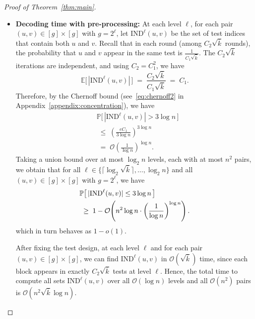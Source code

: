 \documentclass[journal]{IEEEtran}
\newcommand{\rEm}{\mathrm{E}_{\max}}
\theoremstyle{definition}
\theoremstyle{definition}
\newcommand{\EE}{\mathbb{E}}
\newcommand{\PP}{\mathbb{P}}
\newcommand{\kb}{\overline{k}}
\newcommand{\ID}{\mathrm{IND}}
\newcommand{\bigO}{\mathcal{O}}
\begin{document}
\begin{proof}[Proof of Theorem~\ref{thm:main}]
\begin{itemize}
		A similar argument applies to the case \( \theta \leq \frac{1}{2} \), with at most \( \rEm =  2\kb \log^2 \kb \) (see~\eqref{eq:number_edges_level}) defective pairs at each level.

    \item \textbf{Decoding time with pre-processing:} At each level $\ell$, for each pair $(u,v) \in [g]\times[g]$ with $g=2^\ell$, let $\ID^{\ell}(u,v)$ be the set of test indices that contain both $u$ and $v$. Recall that in each round (among $C_2\sqrt{\kb}$ rounds), the probability that $u$ and $v$ appear in the same test is $\frac{1}{C_1\sqrt{\kb}}$. The $C_2\sqrt{\kb}$ iterations are independent, and using $C_2=C_1^2$, we have
     \[
       \EE\!\big[\,|\ID^{\ell}(u,v)|\,\big] \;=\; \frac{C_2\sqrt{\kb}}{C_1\sqrt{\kb}} \;=\; C_1.
     \]
Therefore, by the Chernoff bound (see~\eqref{eq:chernoff2} in Appendix~\ref{appendix:concentration}), we have 
\begin{align*}
    &\PP\big[\,|\ID^{\ell}(u,v)| > 3\log n\,\big] \\
    &\;\le\; \left(\frac{eC_1}{3\log n}\right)^{3\log n} \\
    &\;=\; \bigO\!\left(\frac{1}{\log n}\right)^{\log n}.
\end{align*}
Taking a union bound over at most $\log_2 n$ levels, each with at most $n^2$ pairs, we obtain that for all $\ell \in \{\lceil \log_2 \sqrt{\kb}\rceil,\dots,\log_2 n\}$ and all $(u,v)\in[g]\times[g]$ with $g=2^\ell$, we have
\begin{align}
    &\PP\big[\,|\ID^{\ell}(u,v)| \le 3\log n\,\big] \notag \\
    &\;\ge\; 1 - \bigO\!\left(n^2\log n 
       \cdot \left(\frac{1}{\log n}\right)^{\log n}\right).
    \label{eq:bound_index_tests}
\end{align}
which in turn behaves as $1-o(1)$.

After fixing the test design, at each level $\ell$ and for each pair $(u,v)\in[g]\times[g]$, we can find $\ID^{\ell}(u,v)$ in $\bigO(\sqrt{\kb})$ time, since each block appears in exactly $C_2\sqrt{\kb}$ tests at level $\ell$. Hence, the total time to compute all sets $\ID^{\ell}(u,v)$ over all $\bigO(\log n)$ levels and all $\bigO(n^2)$ pairs is $\bigO(n^2\sqrt{\kb}\log n)$.


\end{itemize}
\end{proof}
\end{document}
